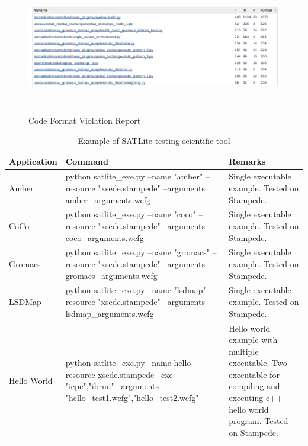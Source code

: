 \documentclass[10pt]{ruthesis}
\begin{document}
\label{}
\begin{figure}
 \begin{center}
  \includegraphics[width=17cm,height=6cm]{vio_report.png}
  \caption{Code Format Violation Report}
  \label{fig:vio_report}
  \end{center}
\end{figure}


\begin{table}
\begin{center}
\def\arraystretch{2}
\begin{tabular}{|p{2.5cm}|p{8cm}|p{5cm}|}
\hline
\rule{0pt}{5pt} \textbf{Application} & \textbf{Command} & \textbf{Remarks} \\[2ex]
\hline
Amber & python satlite\_exe.py --name "amber" --resource "xsede.stampede" --arguments amber\_arguments.wcfg & Single executable example. Tested on Stampede.
\\
\hline
CoCo & python satlite\_exe.py --name "coco" --resource "xsede.stampede" --arguments coco\_arguments.wcfg & Single executable example. Tested on Stampede.
\\
\hline
Gromacs & python satlite\_exe.py --name "gromacs" --resource "xsede.stampede" --arguments gromacs\_arguments.wcfg & Single executable example. Tested on Stampede.
\\
\hline
LSDMap & python satlite\_exe.py --name "lsdmap" --resource "xsede.stampede" --arguments lsdmap\_arguments.wcfg & Single executable example. Tested on Stampede.
\\
\hline
Hello World & python satlite\_exe.py --name hello --resource xsede.stampede --exe {"icpc","ibrun"} --arguments {"hello\_test1.wcfg","hello\_test2.wcfg"} & Hello world example with multiple executable. Two executable for compiling and executing c++ hello world program. Tested on Stampede.
\\
\hline
\end{tabular}
\end{center}
\caption{Example of SATLite testing scientific tool}
\label{satexample}
\end{table}
\end{document}
